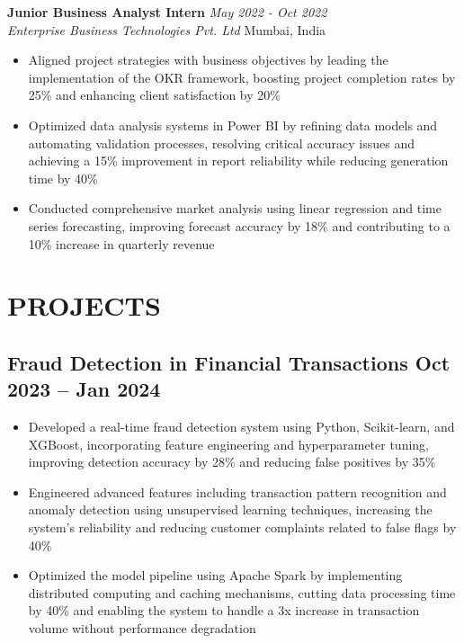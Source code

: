 \documentclass[12pt,a4paper]{article}
\newcommand{\workexp}[4]{
  \textbf{#1} \hfill \textit{#2}\\
  \textit{#3} \hfill #4\\
  \vspace{-1em} %
}
\begin{document}
\workexp{Junior Business Analyst Intern}{May 2022 - Oct 2022}{Enterprise Business Technologies Pvt. Ltd}{Mumbai, India}
\begin{itemize}[leftmargin=*,noitemsep,topsep=0pt]
\item Aligned project strategies with business objectives by leading the implementation of the OKR framework, boosting project completion rates by 25\% and enhancing client satisfaction by 20\%
\item Optimized data analysis systems in Power BI by refining data models and automating validation processes, resolving critical accuracy issues and achieving a 15\% improvement in report reliability while reducing generation time by 40\%
\item Conducted comprehensive market analysis using linear regression and time series forecasting, improving forecast accuracy by 18\% and contributing to a 10\% increase in quarterly revenue
\end{itemize}

\section*{PROJECTS}
\subsection*{Fraud Detection in Financial Transactions \hfill Oct 2023 – Jan 2024}
\begin{itemize}[leftmargin=*,noitemsep,topsep=0pt]
\item Developed a real-time fraud detection system using Python, Scikit-learn, and XGBoost, incorporating feature engineering and hyperparameter tuning, improving detection accuracy by 28\% and reducing false positives by 35\%
\item Engineered advanced features including transaction pattern recognition and anomaly detection using unsupervised learning techniques, increasing the system's reliability and reducing customer complaints related to false flags by 40\%
\item Optimized the model pipeline using Apache Spark by implementing distributed computing and caching mechanisms, cutting data processing time by 40\% and enabling the system to handle a 3x increase in transaction volume without performance degradation
\end{itemize}
\end{document}
